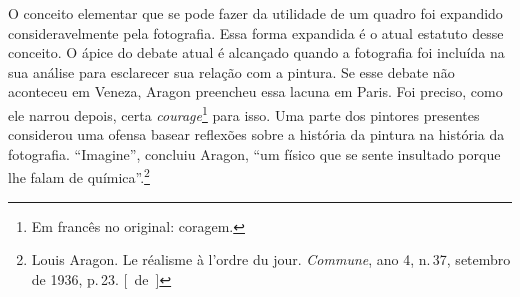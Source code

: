 O conceito elementar que se pode fazer da utilidade de um quadro foi
expandido consideravelmente pela fotografia. Essa forma expandida é o
atual estatuto desse conceito. O ápice do debate atual é alcançado quando a
fotografia foi incluída na sua análise para esclarecer sua relação com a pintura. Se esse debate não aconteceu em Veneza, Aragon preencheu essa lacuna em Paris. Foi
preciso, como ele narrou depois, certa \emph{courage}\footnote{Em
  francês no original: coragem. \versal{[N.~T.]}} para isso. Uma parte dos
pintores presentes
considerou uma ofensa basear reflexões sobre a história da pintura na
história da fotografia. ``Imagine'', concluiu Aragon, ``um físico que se
sente insultado porque lhe falam de química''.\footnote{Louis Aragon. Le
  réalisme à l'ordre du jour. \emph{Commune}, ano 4, n.\,37, setembro de 1936, p.\,23. [~de~]}


